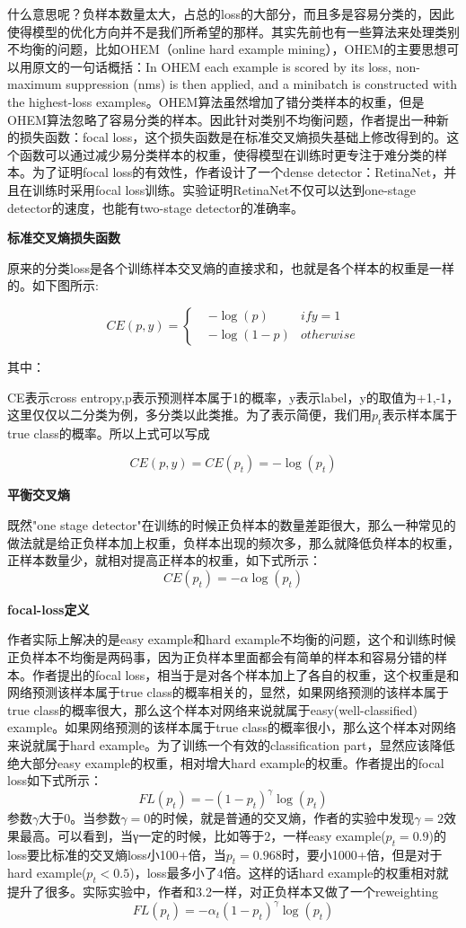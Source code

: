 什么意思呢？负样本数量太大，占总的loss的大部分，而且多是容易分类的，因此使得模型的优化方向并不是我们所希望的那样。其实先前也有一些算法来处理类别不均衡的问题，比如OHEM（online hard example mining），OHEM的主要思想可以用原文的一句话概括：In OHEM each example is scored by its loss, non-maximum suppression (nms) is then applied, and a minibatch is constructed with the highest-loss examples。OHEM算法虽然增加了错分类样本的权重，但是OHEM算法忽略了容易分类的样本。因此针对类别不均衡问题，作者提出一种新的损失函数：focal loss，这个损失函数是在标准交叉熵损失基础上修改得到的。这个函数可以通过减少易分类样本的权重，使得模型在训练时更专注于难分类的样本。为了证明focal loss的有效性，作者设计了一个dense detector：RetinaNet，并且在训练时采用focal loss训练。实验证明RetinaNet不仅可以达到one-stage detector的速度，也能有two-stage detector的准确率。

\textbf{标准交叉熵损失函数}

原来的分类loss是各个训练样本交叉熵的直接求和，也就是各个样本的权重是一样的。如下图所示:

\begin{equation}
CE(p,y)=\left\{
\begin{aligned}
& -\log (p) 	&if y = 1\\
& -\log (1-p) 	&otherwise
\end{aligned}
\right.
\end{equation}

其中：

CE表示cross entropy,p表示预测样本属于1的概率，y表示label，y的取值为{+1,-1}，这里仅仅以二分类为例，多分类以此类推。为了表示简便，我们用$p_t$表示样本属于true class的概率。所以上式可以写成

\[
	CE(p,y) = CE(p_t) = -\log (p_t)
\]

\textbf{平衡交叉熵}

既然"one stage detector"在训练的时候正负样本的数量差距很大，那么一种常见的做法就是给正负样本加上权重，负样本出现的频次多，那么就降低负样本的权重，正样本数量少，就相对提高正样本的权重，如下式所示：
\[
	CE(p_t) = -\alpha \log (p_t)
\]

\textbf{focal-loss定义}

作者实际上解决的是easy example和hard example不均衡的问题，这个和训练时候正负样本不均衡是两码事，因为正负样本里面都会有简单的样本和容易分错的样本。作者提出的focal loss，相当于是对各个样本加上了各自的权重，这个权重是和网络预测该样本属于true class的概率相关的，显然，如果网络预测的该样本属于true class的概率很大，那么这个样本对网络来说就属于easy(well-classified) example。如果网络预测的该样本属于true class的概率很小，那么这个样本对网络来说就属于hard example。为了训练一个有效的classification part，显然应该降低绝大部分easy example的权重，相对增大hard example的权重。作者提出的focal loss如下式所示： 
\[
	FL(p_t) = -(1 - p_t)^\gamma \log (p_t)
\]
参数$\gamma$大于0。当参数$\gamma = 0$的时候，就是普通的交叉熵，作者的实验中发现$\gamma = 2$效果最高。可以看到，当γ一定的时候，比如等于2，一样easy example($p_t = 0.9$)的loss要比标准的交叉熵loss小100+倍，当$p_t=0.968$时，要小1000+倍，但是对于hard example($p_t < 0.5$)，loss最多小了4倍。这样的话hard example的权重相对就提升了很多。实际实验中，作者和3.2一样，对正负样本又做了一个reweighting 
\[
	FL(p_t) = -\alpha _t(1 - p_t)^\gamma \log (p_t)
\]

